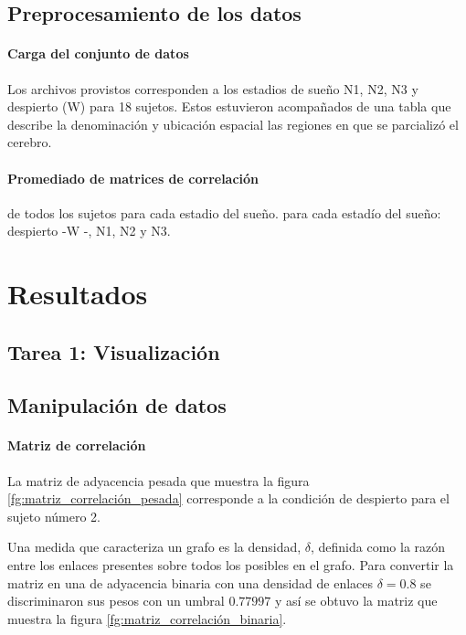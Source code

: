 \documentclass{article}
\begin{document}
\subsection{Preprocesamiento de los datos}

\paragraph{Carga del conjunto de datos} 
Los archivos provistos corresponden a los estadios de sueño N1, N2, N3 y despierto (W) para 18 sujetos.
Estos estuvieron acompañados de una tabla que describe la denominación y  ubicación espacial las regiones en que se parcializó el cerebro.

\paragraph{Promediado de matrices de correlación} de todos los sujetos para cada estadio del sueño.
para cada estadío del sueño: despierto -W -, N1, N2 y N3.


\section{Resultados}

\subsection{Tarea 1: Visualización}


\subsection{Manipulación de datos}

\paragraph{Matriz de correlación}
La matriz de adyacencia pesada que muestra la figura \ref{fg:matriz_correlación_pesada} corresponde a la condición de despierto para el sujeto número 2.

Una medida que caracteriza un grafo es la densidad, $\delta$, definida como la razón entre los enlaces presentes sobre todos los posibles en el grafo.
Para convertir la matriz en una de adyacencia binaria con una densidad de enlaces \(\delta = 0.8\) se discriminaron sus pesos con un umbral \(0.77997\) y así se obtuvo la matriz que muestra la figura \ref{fg:matriz_correlación_binaria}.
\end{document}
